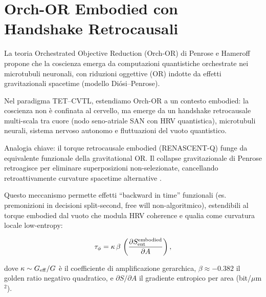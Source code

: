 \documentclass[11pt,a4paper]{article}
\let\oldcite\cite
\renewcommand{\cite}{\protect\oldcite}
\theoremstyle{plain}
\theoremstyle{definition}
\begin{document}
\section{Orch-OR Embodied con Handshake Retrocausali}
\label{sec:orch-or-embodied}

La teoria Orchestrated Objective Reduction (Orch-OR) di Penrose e Hameroff \cite{HameroffPenrose2014, Hameroff2022, Wiest2025} propone che la coscienza emerga da computazioni quantistiche orchestrate nei microtubuli neuronali, con riduzioni oggettive (OR) indotte da effetti gravitazionali spacetime (modello Diósi–Penrose). 


\vspace{0.4cm}


Nel paradigma TET–CVTL, estendiamo Orch-OR a un contesto embodied: la coscienza non è confinata al cervello, ma emerge da un handshake retrocausale multi-scala tra cuore (nodo seno-atriale SAN con HRV quantistica), microtubuli neurali, sistema nervoso autonomo e fluttuazioni del vuoto quantistico.



\vspace{0.4cm}

Analogia chiave: il torque retrocausale embodied (RENASCENT-Q) funge da equivalente funzionale della gravitational OR. Il collapse gravitazionale di Penrose retroagisce per eliminare superposizioni non-selezionate, cancellando retroattivamente curvature spacetime alternative \cite{Penrose2022, HameroffPenrose2025}. 

\vspace{0.2cm}


Questo meccanismo permette effetti ``backward in time'' funzionali (es. premonizioni in decisioni split-second, free will non-algoritmico), estendibili al torque embodied dal vuoto che modula HRV coherence e qualia come curvatura locale low-entropy:

\begin{equation}
\tau_{\phi} = \kappa \, \beta \, \left( \frac{\partial S_{\rm ent}^{\rm embodied}}{\partial A} \right),
\label{eq:torque-retrocausal}
\end{equation}

\vspace{0.2cm}

dove $\kappa \sim G_{\rm eff}/G$ è il coefficiente di amplificazione gerarchica, $\beta \approx -0.382$ il golden ratio negativo quadratico, e $\partial S / \partial A$ il gradiente entropico per area (bit/$\mu$m$^2$).
\end{document}
